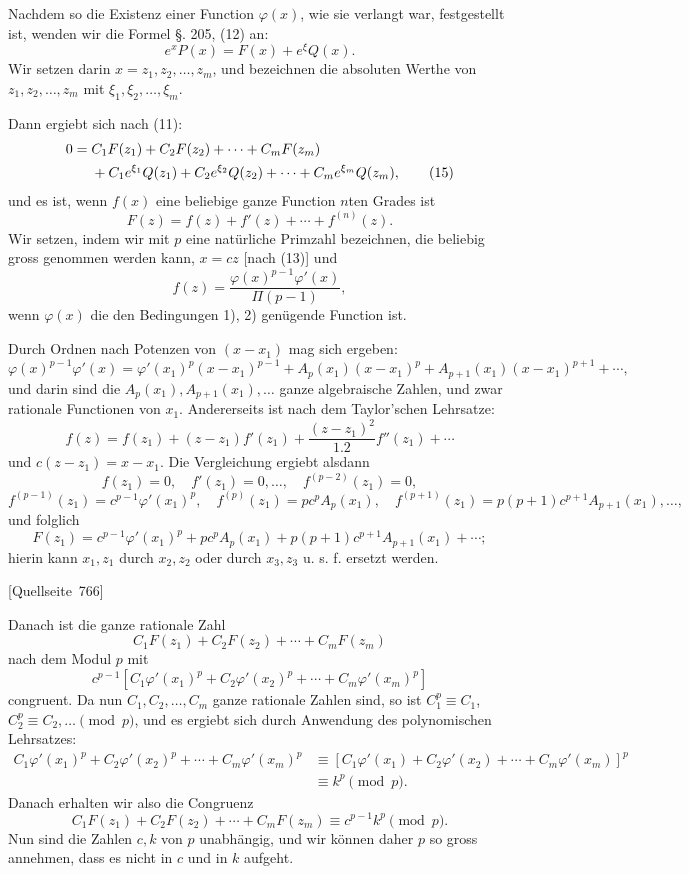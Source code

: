 \documentclass[11pt]{article}
\newcommand{\srcpage}[1]{\par\medskip\noindent\textsf{[Quellseite~#1]}\par\smallskip}
\begin{document}
Nachdem so die Existenz einer Function $\varphi(x)$, wie sie verlangt war, festgestellt ist, wenden wir die Formel §. 205, (12) an:
\[
e^xP(x)=F(x)+e^\xi Q(x).
\]
Wir setzen darin $x=z_1,z_2,\ldots,z_m$, und bezeichnen die absoluten Werthe von $z_1,z_2,\ldots,z_m$ mit $\xi_1,\xi_2,\ldots,\xi_m$.

Dann ergiebt sich nach (11):
\begin{align}
0={}&C_1F(z_1)+C_2F(z_2)+\cdots+C_mF(z_m)\notag\\
&+C_1e^{\xi_1}Q(z_1)+C_2e^{\xi_2}Q(z_2)+\cdots+C_me^{\xi_m}Q(z_m),
\tag{15}
\end{align}
und es ist, wenn $f(x)$ eine beliebige ganze Function $n$ten Grades ist
\begin{equation}\tag{16}
F(z)=f(z)+f'(z)+\cdots+f^{(n)}(z).
\end{equation}
Wir setzen, indem wir mit $p$ eine natürliche Primzahl bezeichnen, die beliebig gross genommen werden kann, $x=cz$ [nach (13)] und
\begin{equation}\tag{17}
f(z)=\frac{\varphi(x)^{p-1}\varphi'(x)}{\Pi(p-1)},
\end{equation}
wenn $\varphi(x)$ die den Bedingungen 1), 2) genügende Function ist.

Durch Ordnen nach Potenzen von $(x-x_1)$ mag sich ergeben:
\[
\varphi(x)^{p-1}\varphi'(x)=
\varphi'(x_1)^p(x-x_1)^{p-1}
+A_p(x_1)(x-x_1)^p
+A_{p+1}(x_1)(x-x_1)^{p+1}+\cdots,
\]
und darin sind die $A_p(x_1),A_{p+1}(x_1),\ldots$ ganze algebraische Zahlen, und zwar rationale Functionen von $x_1$. Andererseits ist nach dem Taylor'schen Lehrsatze:
\[
f(z)=f(z_1)+(z-z_1)f'(z_1)+\frac{(z-z_1)^2}{1.2}f''(z_1)+\cdots
\]
und $c(z-z_1)=x-x_1$. Die Vergleichung ergiebt alsdann
\[
f(z_1)=0,\quad f'(z_1)=0,\ldots,\quad f^{(p-2)}(z_1)=0,
\]
\[
f^{(p-1)}(z_1)=c^{p-1}\varphi'(x_1)^p,\quad
f^{(p)}(z_1)=pc^pA_p(x_1),\quad
f^{(p+1)}(z_1)=p(p+1)c^{p+1}A_{p+1}(x_1),\ldots,
\]
und folglich
\[
F(z_1)=c^{p-1}\varphi'(x_1)^p+pc^pA_p(x_1)+p(p+1)c^{p+1}A_{p+1}(x_1)+\cdots;
\]
hierin kann $x_1,z_1$ durch $x_2,z_2$ oder durch $x_3,z_3$ u. s. f. ersetzt werden.

\srcpage{766}
Danach ist die ganze rationale Zahl
\[
C_1F(z_1)+C_2F(z_2)+\cdots+C_mF(z_m)
\]
nach dem Modul $p$ mit
\[
c^{p-1}\left[C_1\varphi'(x_1)^p+C_2\varphi'(x_2)^p+\cdots+C_m\varphi'(x_m)^p\right]
\]
congruent. Da nun $C_1,C_2,\ldots,C_m$ ganze rationale Zahlen sind, so ist $C_1^p\equiv C_1$, $C_2^p\equiv C_2,\ldots\pmod p$, und es ergiebt sich durch Anwendung des polynomischen Lehrsatzes:
\[
\begin{aligned}
C_1\varphi'(x_1)^p+C_2\varphi'(x_2)^p+\cdots+C_m\varphi'(x_m)^p
&\equiv
\left[C_1\varphi'(x_1)+C_2\varphi'(x_2)+\cdots+C_m\varphi'(x_m)\right]^p\\
&\equiv k^p \pmod p.
\end{aligned}
\]
Danach erhalten wir also die Congruenz
\begin{equation}\tag{18}
C_1F(z_1)+C_2F(z_2)+\cdots+C_mF(z_m)\equiv c^{p-1}k^p\pmod p.
\end{equation}
Nun sind die Zahlen $c,k$ von $p$ unabhängig, und wir können daher $p$ so gross annehmen, dass es nicht in $c$ und in $k$ aufgeht.
\end{document}
